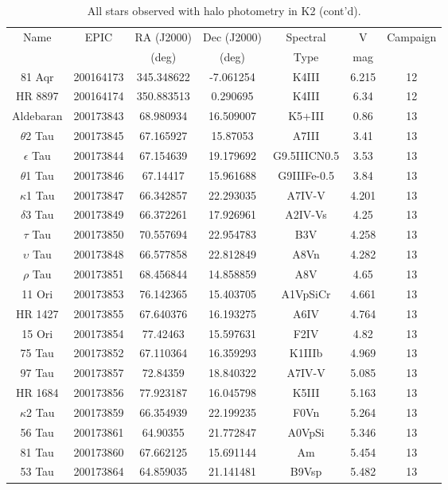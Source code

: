 \begin{table*}
\caption{All stars observed with halo photometry in K2 (cont'd).}
\begin{tabular}{ccccccc}
\hline \hline
Name & EPIC & RA (J2000) & Dec (J2000) & Spectral & V & Campaign \\
 &  & (deg) & (deg) & Type & mag &  \\
\hline
81 Aqr & 200164173 & 345.348622 & -7.061254 & K4III & 6.215 & 12 \\
HR 8897 & 200164174 & 350.883513 & 0.290695 & K4III & 6.34 & 12 \\
Aldebaran & 200173843 & 68.980934 & 16.509007 & K5+III & 0.86 & 13 \\
$\theta$2 Tau & 200173845 & 67.165927 & 15.87053 & A7III & 3.41 & 13 \\
$\epsilon$ Tau & 200173844 & 67.154639 & 19.179692 & G9.5IIICN0.5 & 3.53 & 13 \\
$\theta$1 Tau & 200173846 & 67.14417 & 15.961688 & G9IIIFe-0.5 & 3.84 & 13 \\
$\kappa$1 Tau & 200173847 & 66.342857 & 22.293035 & A7IV-V & 4.201 & 13 \\
$\delta$3 Tau & 200173849 & 66.372261 & 17.926961 & A2IV-Vs & 4.25 & 13 \\
$\tau$ Tau & 200173850 & 70.557694 & 22.954783 & B3V & 4.258 & 13 \\
$\upsilon$ Tau & 200173848 & 66.577858 & 22.812849 & A8Vn & 4.282 & 13 \\
$\rho$ Tau & 200173851 & 68.456844 & 14.858859 & A8V & 4.65 & 13 \\
11 Ori & 200173853 & 76.142365 & 15.403705 & A1VpSiCr & 4.661 & 13 \\
HR 1427 & 200173855 & 67.640376 & 16.193275 & A6IV & 4.764 & 13 \\
15 Ori & 200173854 & 77.42463 & 15.597631 & F2IV & 4.82 & 13 \\
75 Tau & 200173852 & 67.110364 & 16.359293 & K1IIIb & 4.969 & 13 \\
97 Tau & 200173857 & 72.84359 & 18.840322 & A7IV-V & 5.085 & 13 \\
HR 1684 & 200173856 & 77.923187 & 16.045798 & K5III & 5.163 & 13 \\
$\kappa$2 Tau & 200173859 & 66.354939 & 22.199235 & F0Vn & 5.264 & 13 \\
56 Tau & 200173861 & 64.90355 & 21.772847 & A0VpSi & 5.346 & 13 \\
81 Tau & 200173860 & 67.662125 & 15.691144 & Am & 5.454 & 13 \\
53 Tau & 200173864 & 64.859035 & 21.141481 & B9Vsp & 5.482 & 13 \\

\end{tabular}
\end{table*}

